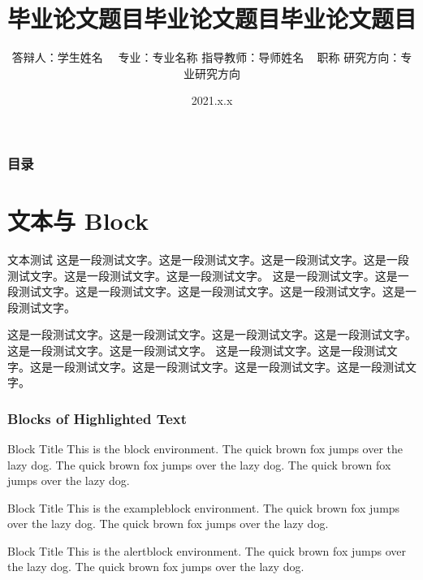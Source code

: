 \documentclass[notheorems,11pt,compress]{beamer}
\title[论文题目]{毕业论文题目毕业论文题目毕业论文题目}
\author[学生姓名]
{
    答辩人：学生姓名~~ \vskip 3mm
    专业：专业名称 \vskip 3mm
    指导教师：导师姓名 ~ 职称 \vskip 3mm
    研究方向：专业研究方向
}
\institute[学校名称]{}
\date[2021.x.x]{2021.x.x}
\numberwithin{figure}{section}
\numberwithin{table}{section}
\numberwithin{equation}{section}
\numberwithin{theorem}{section}
\numberwithin{definition}{section}
\numberwithin{lemma}{section}
\numberwithin{proposition}{section}
\numberwithin{corollary}{section}
\theoremstyle{example}
\begin{document}
\setlength{\baselineskip}{15pt}


\begin{frame}
\titlepage
\end{frame}

\begin{frame}
\frametitle{目录}
  \vskip 10pt
  \hspace*{1.5em}
  \parbox[t]{.95\textwidth}{
  \begin{minipage}[c]{\textwidth}
  \setlength{\baselineskip}{2.8em}
  \tableofcontents
  \end{minipage}
  }
\end{frame}



\section{文本与 Block}

\begin{frame}{文本测试}
这是一段测试文字。这是一段测试文字。这是一段测试文字。这是一段测试文字。这是一段测试文字。这是一段测试文字。
这是一段测试文字。这是一段测试文字。这是一段测试文字。这是一段测试文字。这是一段测试文字。这是一段测试文字。

\vspace{1ex}
这是一段测试文字。这是一段测试文字。这是一段测试文字。这是一段测试文字。这是一段测试文字。这是一段测试文字。
这是一段测试文字。这是一段测试文字。这是一段测试文字。这是一段测试文字。这是一段测试文字。这是一段测试文字。

\end{frame}


\begin{frame}
\frametitle{Blocks of Highlighted Text}
\begin{block}{Block Title}
This is the block environment. The quick brown fox jumps over the lazy dog. The quick brown fox jumps over the lazy dog. The quick brown fox jumps over the lazy dog.
\end{block}

\begin{exampleblock}{Block Title}
This is the exampleblock environment. The quick brown fox jumps over the lazy dog. The quick brown fox jumps over the lazy dog.
\end{exampleblock}

\begin{alertblock}{Block Title}
This is the alertblock environment. The quick brown fox jumps over the lazy dog. The quick brown fox jumps over the lazy dog.
\end{alertblock}
\end{frame}
\end{document}
